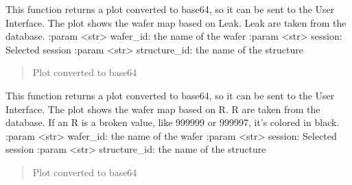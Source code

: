 \documentclass[letterpaper,10pt,english]{sphinxmanual}
\begin{document}

\begin{fulllineitems}
\label{\detokenize{WaferMaps:WaferMaps.Leak_wafer_map}}
\pysigstartsignatures
{}
\pysigstopsignatures
\sphinxAtStartPar
This function returns a plot converted to base64, so it can be sent to the User Interface. The plot shows the wafer map based on Leak.
Leak are taken from the database.
:param \textless{}str\textgreater{} wafer\_id: the name of the wafer
:param \textless{}str\textgreater{} session: Selected session
:param \textless{}str\textgreater{} structure\_id: the name of the structure
\begin{quote}\begin{description}
\sphinxAtStartPar
Plot converted to base64

\end{description}\end{quote}

\end{fulllineitems}


\begin{fulllineitems}
\label{\detokenize{WaferMaps:WaferMaps.R_wafer_map}}
\pysigstartsignatures
{}
\pysigstopsignatures
\sphinxAtStartPar
This function returns a plot converted to base64, so it can be sent to the User Interface. The plot shows the wafer map based on R.
R are taken from the database. If an R is a broken value, like 999999 or 999997, it’s colored in black.
:param \textless{}str\textgreater{} wafer\_id: the name of the wafer
:param \textless{}str\textgreater{} session: Selected session
:param \textless{}str\textgreater{} structure\_id: the name of the structure
\begin{quote}\begin{description}
\sphinxAtStartPar
Plot converted to base64

\end{description}\end{quote}

\end{fulllineitems}
\end{document}
